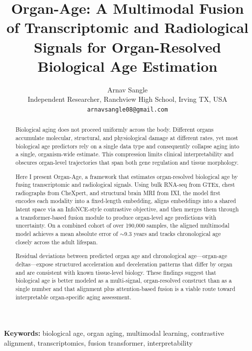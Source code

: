 \documentclass[12pt]{article}
\title{Organ-Age: A Multimodal Fusion of Transcriptomic and Radiological Signals for Organ-Resolved Biological Age Estimation}
\author{
  Arnav Sangle \\
  Independent Researcher, Ranchview High School, Irving TX, USA \\
  \texttt{arnavsangle08@gmail.com}
}
\date{}
\begin{document}
\maketitle

\begin{abstract}
Biological aging does not proceed uniformly across the body. Different organs accumulate
molecular, structural, and physiological damage at different rates, yet most biological age
predictors rely on a single data type and consequently collapse aging into a single,
organism-wide estimate. This compression limits clinical interpretability and obscures organ-level
trajectories that span both gene regulation and tissue morphology.

Here I present Organ-Age, a framework that estimates organ-resolved biological age by fusing
transcriptomic and radiological signals. Using bulk RNA-seq from GTEx, chest radiographs from
CheXpert, and structural brain MRI from IXI, the model first encodes each modality into a
fixed-length embedding, aligns embeddings into a shared latent space via an InfoNCE-style
contrastive objective, and then merges them through a transformer-based fusion module to
produce organ-level age predictions with uncertainty. On a combined cohort of over 190,000
samples, the aligned multimodal model achieves a mean absolute error of $\sim$9.3 years and
tracks chronological age closely across the adult lifespan.

Residual deviations between predicted organ age and chronological age---organ-age deltas---expose
structured acceleration and deceleration patterns that differ by organ and are consistent with
known tissue-level biology. These findings suggest that biological age is better modeled as a
multi-signal, organ-resolved construct than as a single number and that alignment plus attention-based
fusion is a viable route toward interpretable organ-specific aging assessment.
\end{abstract}

\vspace{1em}
\noindent\textbf{Keywords:} biological age, organ aging, multimodal learning, contrastive alignment, transcriptomics, fusion transformer, interpretability
\end{document}
